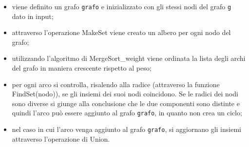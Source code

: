 \begin{itemize}
    
    \item viene definito un grafo \texttt{grafo} e inizializzato con gli stessi nodi del grafo \texttt{g} dato in input;
    
    \item attraverso l'operazione MakeSet viene creato un albero per ogni nodo del grafo;
    
    \item utilizzando l'algoritmo di MergeSort\_weight viene ordinata la lista degli archi del grafo in maniera crescente rispetto al peso;
    
    \item per ogni arco si controlla, risalendo alla radice (attraverso la funzione FindSet(nodo)), se gli insiemi dei suoi nodi coincidono. Se le radici dei nodi sono diverse si giunge alla conclusione che le due componenti sono distinte e quindi l'arco può essere aggiunto al grafo \texttt{grafo}, in quanto non crea un ciclo;
    
    \item nel caso in cui l'arco venga aggiunto al grafo \texttt{grafo}, si aggiornano gli insiemi attraverso l'operazione di Union.
\end{itemize}
